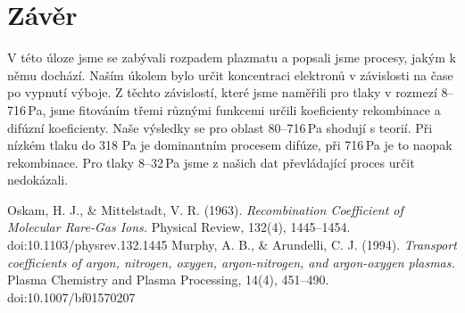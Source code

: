 \documentclass[a4paper,12pt]{article}
\begin{document}
\section{Závěr}
V této úloze jsme se zabývali rozpadem plazmatu a popsali jsme procesy, jakým k 
němu dochází. Naším úkolem bylo určit koncentraci elektronů v závislosti na 
čase po vypnutí výboje. Z těchto závislostí, které jsme naměřili pro 
tlaky v rozmezí 8--716\,Pa, jsme fitováním třemi různými funkcemi určili 
koeficienty rekombinace a difúzní koeficienty. Naše výsledky se pro oblast 
80--716\,Pa shodují s teorií. Při nízkém tlaku do 318 Pa je dominantním 
procesem difúze, při 716\,Pa je to naopak rekombinace. Pro tlaky 8--32\,Pa jsme 
z našich dat převládající proces určit nedokázali.

\begin{thebibliography}{10}
	Oskam, H. J., \& Mittelstadt, V. R. (1963). \textit{Recombination 
	Coefficient of 
	Molecular Rare-Gas Ions.} Physical Review, 132(4), 1445–1454. 
	doi:10.1103/physrev.132.1445 
	Murphy, A. B., \& Arundelli, C. J. (1994). \textit{Transport coefficients 
	of argon, nitrogen, oxygen, argon-nitrogen, and argon-oxygen plasmas.} 
	Plasma Chemistry and Plasma Processing, 14(4), 451–490. 
	doi:10.1007/bf01570207 
\end{thebibliography}
\end{document}
